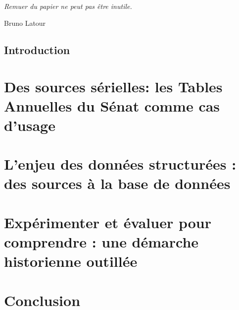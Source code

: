 \documentclass[12pt,twoside]{book}
\begin{document}
\chapter{}
\vspace*{\fill} 
\epigraph{\itshape Remuer du papier ne peut pas être inutile.}{Bruno Latour}

\vfill\clearpage

	
\chapter{Introduction}	


\newpage{\pagestyle{empty}\cleardoublepage}


\mainmatter

\part{Des sources sérielles: les Tables Annuelles du Sénat comme cas d'usage}






\part{L'enjeu des données structurées : des sources à la base de données}






\part{Expérimenter et évaluer pour comprendre : une démarche historienne outillée}

%




\part*{Conclusion}
\end{document}
